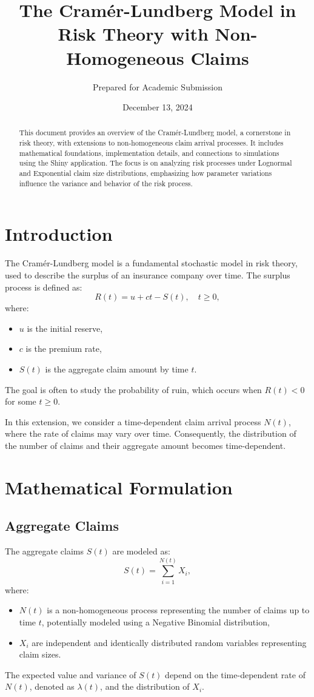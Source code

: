 \documentclass[12pt]{article}
\title{The Cram\'er-Lundberg Model in Risk Theory with Non-Homogeneous Claims}
\author{Prepared for Academic Submission}
\date{December 13, 2024}
\begin{document}
	
	\maketitle
	
	\begin{abstract}
		This document provides an overview of the Cram\'er-Lundberg model, a cornerstone in risk theory, with extensions to non-homogeneous claim arrival processes. It includes mathematical foundations, implementation details, and connections to simulations using the Shiny application. The focus is on analyzing risk processes under Lognormal and Exponential claim size distributions, emphasizing how parameter variations influence the variance and behavior of the risk process.
	\end{abstract}
	
	\section{Introduction}
	The Cram\'er-Lundberg model is a fundamental stochastic model in risk theory, used to describe the surplus of an insurance company over time. The surplus process is defined as:
	\[
	R(t) = u + ct - S(t), \quad t \geq 0,
	\]
	where:
	\begin{itemize}
		\item $u$ is the initial reserve,
		\item $c$ is the premium rate,
		\item $S(t)$ is the aggregate claim amount by time $t$.
	\end{itemize}
	The goal is often to study the probability of ruin, which occurs when $R(t) < 0$ for some $t \geq 0$.
	
	In this extension, we consider a time-dependent claim arrival process $N(t)$, where the rate of claims may vary over time. Consequently, the distribution of the number of claims and their aggregate amount becomes time-dependent.
	
	\section{Mathematical Formulation}
	\subsection{Aggregate Claims}
	The aggregate claims $S(t)$ are modeled as:
	\[
	S(t) = \sum_{i=1}^{N(t)} X_i,
	\]
	where:
	\begin{itemize}
		\item $N(t)$ is a non-homogeneous process representing the number of claims up to time $t$, potentially modeled using a Negative Binomial distribution,
		\item $X_i$ are independent and identically distributed random variables representing claim sizes.
	\end{itemize}
	The expected value and variance of $S(t)$ depend on the time-dependent rate of $N(t)$, denoted as $\lambda(t)$, and the distribution of $X_i$.
	
\end{document}
